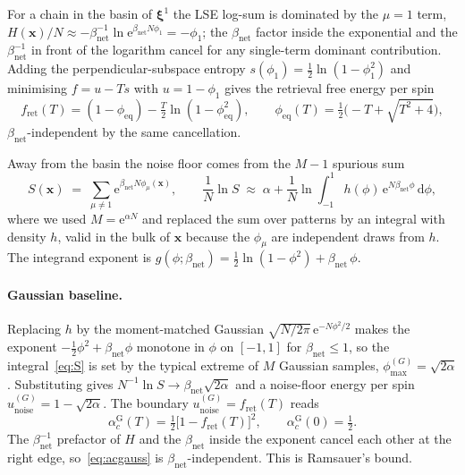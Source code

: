 \documentclass[11pt]{article}
\newcommand{\bxi}{\boldsymbol{\xi}}
\newcommand{\bx}{\bm{x}}
\newcommand{\e}{{\mathrm{e}}}
\newcommand{\dd}{{\mathrm{d}}}
\newcommand{\Bnet}{\beta_{\mathrm{net}}}
\newcommand{\phieq}{\phi_{\mathrm{eq}}}
\newcommand{\fret}{f_{\mathrm{ret}}}
\newcommand{\acGauss}{\alpha_c^{\mathrm{G}}}
\begin{document}
For a chain in the basin of $\bxi^1$ the LSE log-sum is dominated by the
$\mu = 1$ term, $H(\bx)/N \approx -\Bnet^{-1} \ln \e^{\Bnet N \phi_1}
= -\phi_1$; the $\Bnet$ factor inside the exponential and the
$\Bnet^{-1}$ in front of the logarithm cancel for any single-term
dominant contribution.  Adding the perpendicular-subspace entropy
$s(\phi_1) = \tfrac12 \ln(1 - \phi_1^2)$ and minimising
$f = u - Ts$ with $u = 1 - \phi_1$ gives the retrieval free energy
per spin
\begin{equation}
\fret(T) = (1 - \phieq) - \tfrac{T}{2} \ln(1 - \phieq^2),
\qquad
\phieq(T) = \tfrac12\bigl(-T + \sqrt{T^2 + 4}\bigr),
\label{eq:fret}
\end{equation}
$\Bnet$-independent by the same cancellation.

Away from the basin the noise floor comes from the $M-1$ spurious sum
\begin{equation}
S(\bx) \;=\; \sum_{\mu \neq 1} \e^{\Bnet N \phi_\mu(\bx)},
\qquad
\frac{1}{N}\ln S
\;\approx\; \alpha + \frac{1}{N}\ln\!\int_{-1}^{1} h(\phi)\,
            \e^{N \Bnet \phi}\,\dd\phi,
\label{eq:S}
\end{equation}
where we used $M = \e^{\alpha N}$ and replaced the sum over patterns by
an integral with density $h$, valid in the bulk of $\bx$ because the
$\phi_\mu$ are independent draws from $h$.  The integrand exponent is
$g(\phi; \Bnet) = \tfrac12 \ln(1 - \phi^2) + \Bnet\,\phi$.

\paragraph{Gaussian baseline.}
Replacing $h$ by the moment-matched Gaussian
$\sqrt{N/2\pi}\,\e^{-N\phi^2/2}$ makes the exponent
$-\tfrac12 \phi^2 + \Bnet\phi$ monotone in $\phi$ on $[-1,1]$
for $\Bnet \le 1$, so the integral~\eqref{eq:S} is set by the typical
extreme of $M$ Gaussian samples, $\phi_{\max}^{(G)} = \sqrt{2\alpha}$.
Substituting gives $N^{-1}\ln S \to \Bnet \sqrt{2\alpha}$ and a
noise-floor energy per spin
$u_{\mathrm{noise}}^{(G)} = 1 - \sqrt{2\alpha}$.  The boundary
$u_{\mathrm{noise}}^{(G)} = \fret(T)$ reads
\begin{equation}
\acGauss(T) = \tfrac12\bigl[1 - \fret(T)\bigr]^2,
\qquad \acGauss(0) = \tfrac12.
\label{eq:acgauss}
\end{equation}
The $\Bnet^{-1}$ prefactor of $H$ and the $\Bnet$ inside the exponent
cancel each other at the right edge, so~\eqref{eq:acgauss} is
$\Bnet$-independent.  This is Ramsauer's bound.
\end{document}
